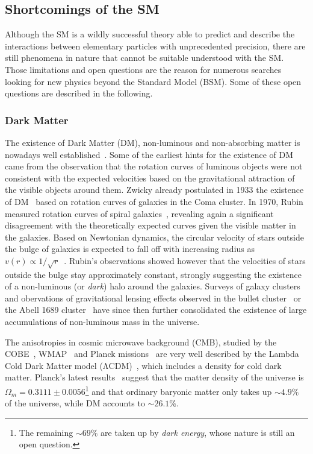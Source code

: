 \subsection{Shortcomings of the SM}

Although the SM is a wildly successful theory able to predict and describe the interactions between elementary particles with unprecedented precision, there are still phenomena in nature that cannot be suitable understood with the SM. Those limitations and open questions are the reason for numerous searches looking for new physics beyond the Standard Model (BSM). Some of these open questions are described in the following. 

\subsubsection{Dark Matter}

The existence of Dark Matter (DM), \ie non-luminous and non-absorbing matter is nowadays well established~\cite{pdg2020}. Some of the earliest hints for the existence of DM came from the observation that the rotation curves of luminous objects were not consistent with the expected velocities based on the gravitational attraction of the visible objects around them. Zwicky already postulated in 1933 the existence of DM~\cite{Zwicky:437297} based on rotation curves of galaxies in the Coma cluster. In 1970, Rubin measured rotation curves of spiral galaxies~\cite{Rubin:1970zza}, revealing again a significant disagreement with the theoretically expected curves given the visible matter in the galaxies. Based on Newtonian dynamics, the circular velocity of stars outside the bulge of galaxies is expected to fall off with increasing radius as $v(r) \propto 1/\sqrt{r}$~\cite{Bertone:2004pz}. Rubin's observations showed however that the velocities of stars outside the bulge stay approximately constant, strongly suggesting the existence of a non-luminous (or \textit{dark}) halo around the galaxies. Surveys of galaxy clusters and obervations of gravitational lensing effects observed in \eg the bullet cluster~\cite{Clowe:2006eq} or the Abell 1689 cluster~\cite{Taylor:1998uk} have since then further consolidated the existence of large accumulations of non-luminous mass in the universe.

The anisotropies in cosmic microwave background (CMB), studied by the COBE~\cite{Bennett:1996ce,COBE}, WMAP~\cite{WMAP2,WMAP1} and Planck missions~\cite{Planck} are very well described by the Lambda Cold Dark Matter model ($\mathrm{\Lambda CDM}$)~\cite{Liddle:1976476}, which includes a density for cold dark matter. Planck's latest results~\cite{Aghanim:2018eyx} suggest that the matter density of the universe is $\Omega_m = 0.3111\pm 0.0056$\footnote{The remaining $\sim 69\%$ are taken up by \textit{dark energy}, whose nature is still an open question.} and that ordinary baryonic matter only takes up $\sim 4.9\%$ of the universe, while DM accounts to $\sim 26.1\%$.

